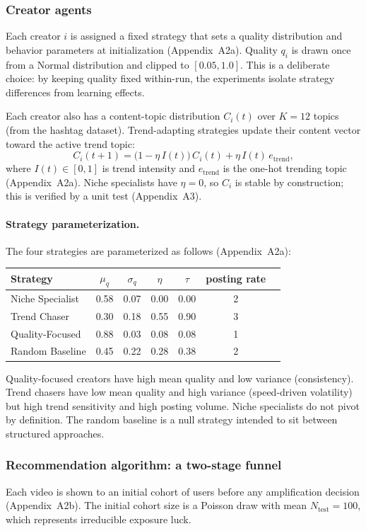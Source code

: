 \documentclass[10pt]{article}
\newcommand{\appref}[1]{(Appendix~#1)}
\begin{document}
\subsubsection{Creator agents}
Each creator \(i\) is assigned a fixed strategy that sets a quality distribution and behavior parameters at initialization \appref{A2a}. Quality \(q_i\) is drawn once from a Normal distribution and clipped to \([0.05,1.0]\). This is a deliberate choice: by keeping quality fixed within-run, the experiments isolate strategy differences from learning effects.

Each creator also has a content-topic distribution \(C_i(t)\) over \(K=12\) topics (from the hashtag dataset). Trend-adapting strategies update their content vector toward the active trend topic:
\[
C_i(t+1) = \bigl(1-\eta\,I(t)\bigr)\,C_i(t) + \eta\,I(t)\,e_{\text{trend}},
\]
where \(I(t)\in[0,1]\) is trend intensity and \(e_{\text{trend}}\) is the one-hot trending topic \appref{A2a}. Niche specialists have \(\eta=0\), so \(C_i\) is stable by construction; this is verified by a unit test \appref{A3}.

\paragraph{Strategy parameterization.}
The four strategies are parameterized as follows \appref{A2a}:
\begin{center}
\small
\begin{tabular}{lcccccc}
\toprule
Strategy & \(\mu_q\) & \(\sigma_q\) & \(\eta\) & \(\tau\) & posting rate \\
\midrule
Niche Specialist & 0.58 & 0.07 & 0.00 & 0.00 & 2 \\
Trend Chaser & 0.30 & 0.18 & 0.55 & 0.90 & 3 \\
Quality-Focused & 0.88 & 0.03 & 0.08 & 0.08 & 1 \\
Random Baseline & 0.45 & 0.22 & 0.28 & 0.38 & 2 \\
\bottomrule
\end{tabular}
\end{center}
Quality-focused creators have high mean quality and low variance (consistency). Trend chasers have low mean quality and high variance (speed-driven volatility) but high trend sensitivity and high posting volume. Niche specialists do not pivot by definition. The random baseline is a null strategy intended to sit between structured approaches.

\subsubsection{Recommendation algorithm: a two-stage funnel}
Each video is shown to an initial cohort of users before any amplification decision \appref{A2b}. The initial cohort size is a Poisson draw with mean \(N_{\text{test}}=100\), which represents irreducible exposure luck.
\end{document}
